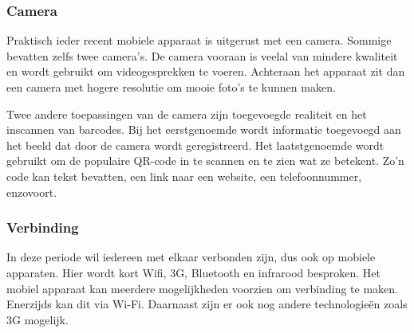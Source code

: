 \subsubsection{Camera}
Praktisch ieder recent mobiele apparaat is uitgerust met een camera. 
Sommige bevatten zelfs twee camera's. 
De camera vooraan is veelal van mindere kwaliteit en wordt gebruikt om videogesprekken te voeren. 
Achteraan het apparaat zit dan een camera met hogere resolutie om mooie foto's te kunnen maken.

Twee andere toepassingen van de camera zijn toegevoegde realiteit en het inscannen van barcodes.
Bij het eerstgenoemde wordt informatie toegevoegd aan het beeld dat door de camera wordt geregistreerd.
Het laatstgenoemde wordt gebruikt om de populaire QR-code in te scannen en te zien wat ze betekent.
Zo'n code kan tekst bevatten, een link naar een website, een telefoonnummer, enzovoort. 

\subsubsection{Verbinding}

In deze periode wil iedereen met elkaar verbonden zijn, dus ook op mobiele apparaten.
Hier wordt kort Wifi, 3G, Bluetooth en infrarood besproken.
Het mobiel apparaat kan meerdere mogelijkheden voorzien om verbinding te maken. 
Enerzijds kan dit via Wi-Fi. Daarnaast zijn er ook nog andere technologieën zoals 3G mogelijk.

% 
% 

